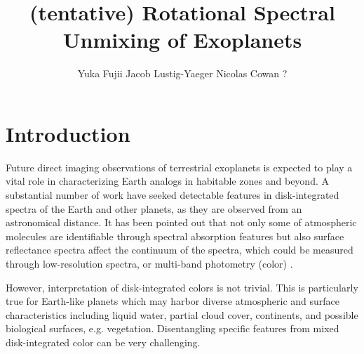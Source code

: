 \documentclass[iop,numberedappendix,apj,]{emulateapj}
\begin{document}
\title{(tentative) Rotational Spectral Unmixing of Exoplanets}


\author{
%
Yuka Fujii 
%
Jacob Lustig-Yaeger 
%
Nicolas Cowan ? 
%
}

      
  
  



\vspace{0.5\baselineskip}


\begin{abstract}

\end{abstract}

  



\section{Introduction}
\label{sec:intro}

Future direct imaging observations of terrestrial exoplanets is expected to play a vital role in characterizing Earth analogs in habitable zones and beyond. 
A substantial number of work have seeked detectable features in disk-integrated spectra of the Earth and other planets, as they are observed from an astronomical distance. 
It has been pointed out that not only some of atmospheric molecules are identifiable through spectral absorption features \citep[e.g.,][]{DesMarais2002} but also surface reflectance spectra affect the continuum of the spectra, which could be measured through low-resolution spectra, or multi-band photometry (color) \citep[e.g.,][]{Ford2001}. 

However, interpretation of disk-integrated colors is not trivial. 
This is particularly true for Earth-like planets which may harbor diverse atmospheric and surface characteristics including liquid water, partial cloud cover, continents, and possible biological surfaces, e.g. vegetation. 
Disentangling specific features from mixed disk-integrated color can be very challenging. 
\end{document}
